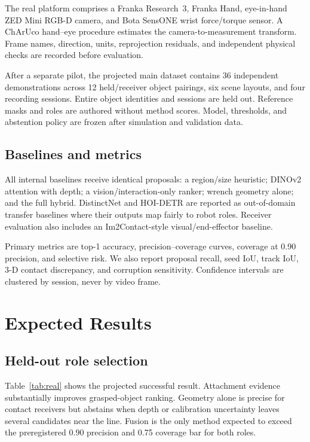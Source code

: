\documentclass[letterpaper,10pt,journal,twoside]{IEEEtran}
\begin{document}
The real platform comprises a Franka Research~3, Franka Hand, eye-in-hand ZED
Mini RGB-D camera, and Bota SensONE wrist force/torque sensor. A ChArUco hand--eye
procedure estimates the camera-to-measurement transform. Frame names, direction,
units, reprojection residuals, and independent physical checks are recorded
before evaluation.

After a separate pilot, the projected main dataset contains 36 independent
demonstrations across 12 held/receiver object pairings, six scene layouts, and
four recording sessions. Entire object identities and sessions are held out.
Reference masks and roles are authored without method scores. Model, thresholds,
and abstention policy are frozen after simulation and validation data.

\subsection{Baselines and metrics}

All internal baselines receive identical proposals: a region/size heuristic;
DINOv2 \cite{oquab2023dinov2} attention with depth; a vision/interaction-only
ranker; wrench geometry alone; and the full hybrid. DistinctNet and HOI-DETR are
reported as out-of-domain transfer baselines where their outputs map fairly to
robot roles. Receiver evaluation also includes an Im2Contact-style
visual/end-effector baseline.

Primary metrics are top-1 accuracy, precision--coverage curves, coverage at
0.90 precision, and selective risk. We also report proposal recall, seed IoU,
track IoU, 3-D contact discrepancy, and corruption sensitivity. Confidence
intervals are clustered by session, never by video frame.

\section{Expected Results}

\subsection{Held-out role selection}

Table~\ref{tab:real} shows the projected successful result. Attachment evidence
substantially improves grasped-object ranking. Geometry alone is precise for
contact receivers but abstains when depth or calibration uncertainty leaves
several candidates near the line. Fusion is the only method expected to exceed
the preregistered 0.90 precision and 0.75 coverage bar for both roles.
\end{document}
